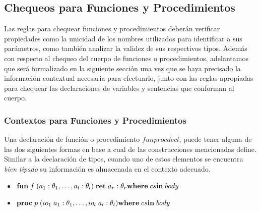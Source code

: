 \subsection{Chequeos para Funciones y Procedimientos}

Las reglas para chequear funciones y procedimientos deberán verificar propiedades como la unicidad de los nombres utilizados para identificar a sus parámetros, como también analizar la validez de sus respectivos tipos.
Además con respecto al chequeo del cuerpo de funciones o procedimientos, adelantamos que será formalizado en la siguiente sección una vez que se haya precisado la información contextual necesaria para efectuarlo, junto con las reglas apropiadas para chequear las declaraciones de variables y sentencias que conforman al cuerpo.

\subsubsection{Contextos para Funciones y Procedimientos}

Una declaración de función o procedimiento $funprocdecl$, puede tener alguna de las dos siguientes formas en base a cual de las construcciones mencionadas define.
Similar a la declaración de tipos, cuando uno de estos elementos se encuentra \textit{bien tipado} su información es almacenada en el contexto adecuado.

\begin{itemize}
    \item
    $
    \mathbf{fun} \; f \; (a_1: \theta_1, \ldots, a_l: \theta_l) \; \mathbf{ret} \; a_r: \theta_r
    \\
    \mathbf{where} \; cs
    \\
    \mathbf{in} \; body
    $
    \item
    $
    \mathbf{proc} \; p \; (io_1 \; a_1: \theta_1, \ldots, io_l \; a_l: \theta_l)
    \\
    \mathbf{where} \; cs
    \\
    \mathbf{in} \; body
    $
\end{itemize}


